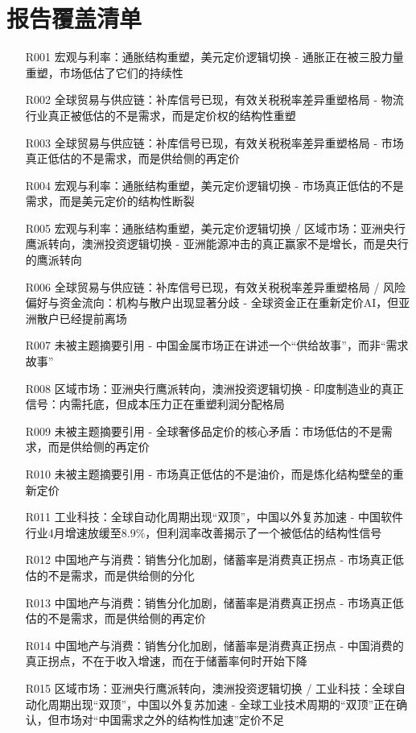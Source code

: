 \documentclass[11pt]{ctexart}
\begin{document}
\section{报告覆盖清单}
\begin{itemize}
  \item [R001] 宏观与利率：通胀结构重塑，美元定价逻辑切换 - 通胀正在被三股力量重塑，市场低估了它们的持续性
  \item [R002] 全球贸易与供应链：补库信号已现，有效关税税率差异重塑格局 - 物流行业真正被低估的不是需求，而是定价权的结构性重塑
  \item [R003] 全球贸易与供应链：补库信号已现，有效关税税率差异重塑格局 - 市场真正低估的不是需求，而是供给侧的再定价
  \item [R004] 宏观与利率：通胀结构重塑，美元定价逻辑切换 - 市场真正低估的不是需求，而是美元定价的结构性断裂
  \item [R005] 宏观与利率：通胀结构重塑，美元定价逻辑切换 / 区域市场：亚洲央行鹰派转向，澳洲投资逻辑切换 - 亚洲能源冲击的真正赢家不是增长，而是央行的鹰派转向
  \item [R006] 全球贸易与供应链：补库信号已现，有效关税税率差异重塑格局 / 风险偏好与资金流向：机构与散户出现显著分歧 - 全球资金正在重新定价AI，但亚洲散户已经提前离场
  \item [R007] 未被主题摘要引用 - 中国金属市场正在讲述一个“供给故事”，而非“需求故事”
  \item [R008] 区域市场：亚洲央行鹰派转向，澳洲投资逻辑切换 - 印度制造业的真正信号：内需托底，但成本压力正在重塑利润分配格局
  \item [R009] 未被主题摘要引用 - 全球奢侈品定价的核心矛盾：市场低估的不是需求，而是供给侧的再定价
  \item [R010] 未被主题摘要引用 - 市场真正低估的不是油价，而是炼化结构壁垒的重新定价
  \item [R011] 工业科技：全球自动化周期出现“双顶”，中国以外复苏加速 - 中国软件行业4月增速放缓至8.9\%，但利润率改善揭示了一个被低估的结构性信号
  \item [R012] 中国地产与消费：销售分化加剧，储蓄率是消费真正拐点 - 市场真正低估的不是需求，而是供给侧的分化
  \item [R013] 中国地产与消费：销售分化加剧，储蓄率是消费真正拐点 - 市场真正低估的不是需求，而是供给侧的再定价
  \item [R014] 中国地产与消费：销售分化加剧，储蓄率是消费真正拐点 - 中国消费的真正拐点，不在于收入增速，而在于储蓄率何时开始下降
  \item [R015] 区域市场：亚洲央行鹰派转向，澳洲投资逻辑切换 / 工业科技：全球自动化周期出现“双顶”，中国以外复苏加速 - 全球工业技术周期的“双顶”正在确认，但市场对“中国需求之外的结构性加速”定价不足

\end{itemize}
\end{document}
